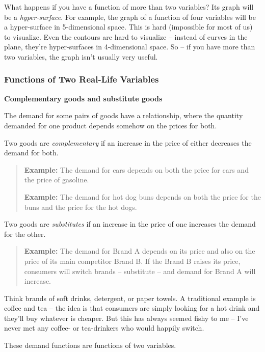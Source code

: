 What happens if you have a function of more than two variables? Its
graph will be a \emph{hyper-surface}. For example, the graph of a
function of four variables will be a hyper-surface in 5-dimensional
space. This is hard (impossible for most of us) to visualize. Even the
contours are hard to visualize -- instead of curves in the plane,
they're hyper-surfaces in 4-dimensional space. So -- if you have more
than two variables, the graph isn't usually very useful.

\subsubsection{Functions of Two Real-Life
Variables}\label{functions-of-two-real-life-variables}

\textbf{Complementary goods and substitute goods}

The demand for some pairs of goods have a relationship, where the
quantity demanded for one product depends somehow on the prices for
both.

Two goods are \emph{complementary} if an increase in the price of either
decreases the demand for both.

\begin{quote}
\textbf{Example:} The demand for cars depends on both the price for cars
and the price of gasoline.

\textbf{Example:} The demand for hot dog buns depends on both the price
for the buns and the price for the hot dogs.
\end{quote}

Two goods are \emph{substitutes} if an increase in the price of one
increases the demand for the other.

\begin{quote}
\textbf{Example:} The demand for Brand A depends on its price and also
on the price of its main competitor Brand B. If the Brand B raises its
price, consumers will switch brands -- substitute -- and demand for
Brand A will increase.
\end{quote}

Think brands of soft drinks, detergent, or paper towels. A traditional
example is coffee and tea -- the idea is that consumers are simply
looking for a hot drink and they'll buy whatever is cheaper. But this
has always seemed fishy to me -- I've never met any coffee- or
tea-drinkers who would happily switch.

These demand functions are functions of two variables.


